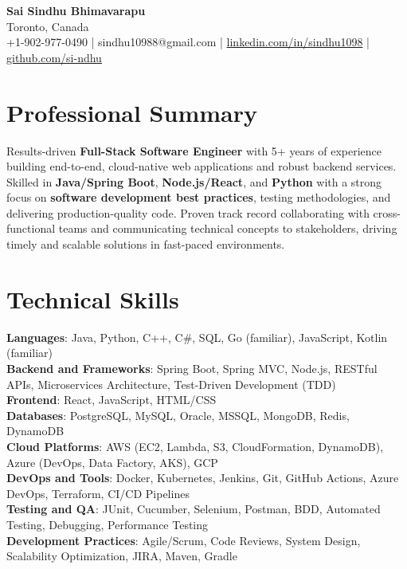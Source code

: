 \documentclass[letterpaper,11pt]{article}
\begin{document}
\begin{center}
  {\Large \textbf{Sai Sindhu Bhimavarapu}} \\
  Toronto, Canada \\
  +1-902-977-0490 \enspace | \enspace sindhu10988@gmail.com \enspace | \enspace \href{https://www.linkedin.com/in/sindhu1098/}{linkedin.com/in/sindhu1098} \enspace | \enspace \href{https://github.com/si-ndhu}{github.com/si-ndhu}
\end{center}

\section{Professional Summary}
  \begin{itemize}[leftmargin=0.15in, label={}]
    \small{\item{
     Results-driven \textbf{Full-Stack Software Engineer} with 5+ years of experience building end-to-end, cloud-native web applications and robust backend services. Skilled in \textbf{Java/Spring Boot}, \textbf{Node.js/React}, and \textbf{Python} with a strong focus on \textbf{software development best practices}, testing methodologies, and delivering production-quality code. Proven track record collaborating with cross-functional teams and communicating technical concepts to stakeholders, driving timely and scalable solutions in fast-paced environments.
    }}
  \end{itemize}
\vspace{-16pt}

\section{Technical Skills}
 \begin{itemize}[leftmargin=0.15in, label={}]
    \small{\item{
     \textbf{Languages}: Java, Python, C++, C\#, SQL, Go (familiar), JavaScript, Kotlin (familiar) \\
     \textbf{Backend and Frameworks}: Spring Boot, Spring MVC, Node.js, RESTful APIs, Microservices Architecture, Test-Driven Development (TDD) \\
     \textbf{Frontend}: React, JavaScript, HTML/CSS \\
     \textbf{Databases}: PostgreSQL, MySQL, Oracle, MSSQL, MongoDB, Redis, DynamoDB \\
     \textbf{Cloud Platforms}: AWS (EC2, Lambda, S3, CloudFormation, DynamoDB), Azure (DevOps, Data Factory, AKS), GCP \\
     \textbf{DevOps and Tools}: Docker, Kubernetes, Jenkins, Git, GitHub Actions, Azure DevOps, Terraform, CI/CD Pipelines \\
     \textbf{Testing and QA}: JUnit, Cucumber, Selenium, Postman, BDD, Automated Testing, Debugging, Performance Testing \\
     \textbf{Development Practices}: Agile/Scrum, Code Reviews, System Design, Scalability Optimization, JIRA, Maven, Gradle
    }}
 \end{itemize}
\vspace{-16pt}
\end{document}

